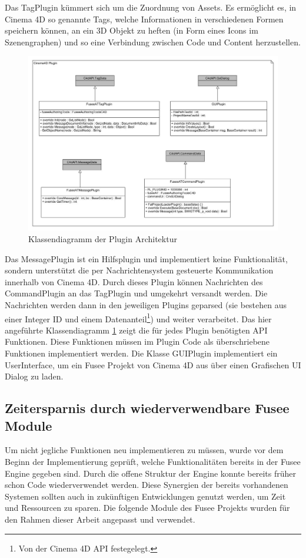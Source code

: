 \documentclass[pagesize, paper=a4, fontsize=12pt, titlepage=true, headings=small, headnosepline, abstractoff, liststotoc, nochapterprefix, plainheadsepline, twoside]{scrreprt}
\begin{document}
Das TagPlugin kümmert sich um die Zuordnung von Assets. Es ermöglicht es, in Cinema 4D so genannte Tags, welche Informationen in verschiedenen Formen speichern können, an ein 3D Objekt zu heften (in Form eines Icons im Szenengraphen) und so eine Verbindung zwischen Code und Content herzustellen.
\begin{figure}[ht]
	\centering
	\includegraphics[width=\linewidth]{Bilder/Klassendiagramm_Plugin.jpg}
	\caption{Klassendiagramm der Plugin Architektur}
	\label{KlassendiagrammPluginArchitektur}
\end{figure}
Das MessagePlugin ist ein Hilfsplugin und implementiert keine Funktionalität, sondern unterstützt die per Nachrichtensystem gesteuerte Kommunikation innerhalb von Cinema 4D. Durch dieses Plugin können Nachrichten des CommandPlugin an das TagPlugin und umgekehrt versandt werden. Die Nachrichten werden dann in den jeweiligen Plugins geparsed (sie bestehen aus einer Integer ID und einem Datenanteil\footnote{Von der Cinema 4D API festegelegt.}) und weiter verarbeitet. 
Das hier angeführte Klassendiagramm \ref{KlassendiagrammPluginArchitektur} zeigt die für jedes Plugin benötigten API Funktionen. Diese Funktionen müssen im Plugin Code als überschriebene Funktionen implementiert werden. Die Klasse GUIPlugin implementiert ein UserInterface, um ein Fusee Projekt von Cinema 4D aus über einen Grafischen UI Dialog zu laden.

\subsection{Zeitersparnis durch wiederverwendbare Fusee Module}
Um nicht jegliche Funktionen neu implementieren zu müssen, wurde vor dem Beginn der Implementierung geprüft, welche Funktionalitäten bereits in der Fusee Engine gegeben sind. Durch die offene Struktur der Engine konnte bereits früher schon Code wiederverwendet werden. Diese Synergien der bereits vorhandenen Systemen sollten auch in zukünftigen Entwicklungen genutzt werden, um Zeit und Ressourcen zu sparen.
Die folgende Module des Fusee Projekts wurden für den Rahmen dieser Arbeit angepasst und verwendet.
\end{document}

